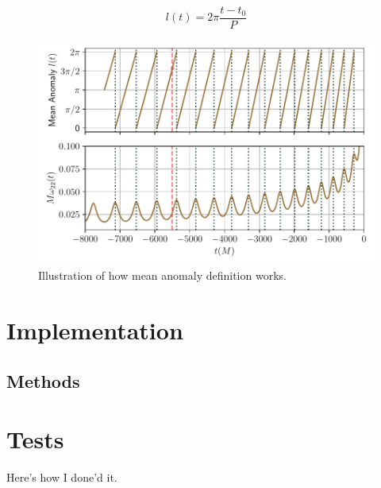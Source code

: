 \documentclass[aps,prd,amsmath,floats,floatfix, twocolumn,
superscriptaddress,nofootinbib,showpacs]{revtex4-1}
\begin{document}
\begin{equation}
\label{eq:mean_anomaly_definition}
l(t) = 2\pi \frac{t - t_0}{P}
\end{equation}

\begin{figure}[thb]
\includegraphics[width=\columnwidth]{mean_ano_definition}
\caption{Illustration of how mean anomaly definition works.}
\label{fig:mean_anomaly_definition}
\end{figure}


\section{Implementation}
\label{sec:implementation}
\subsection{Methods}
\label{sec:methods}

\section{Tests}
\label{sec:tests}
Here's how I done'd it.
\end{document}
